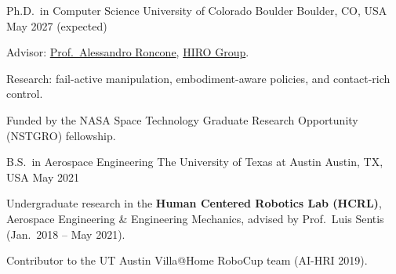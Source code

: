 
\begin{cventries}
  \cventry
  {Ph.D.\ in Computer Science}
  {University of Colorado Boulder}
  {Boulder, CO, USA}
  {May 2027 (expected)}
  {
    \begin{cvitems}
      \item Advisor: \href{https://hiro-group.ronc.one/}{Prof.\ Alessandro Roncone}, \href{https://hiro-group.ronc.one/}{HIRO Group}.
      \item Research: fail-active manipulation, embodiment-aware policies, and contact-rich control.
      \item Funded by the NASA Space Technology Graduate Research Opportunity (NSTGRO) fellowship.
    \end{cvitems}
  }

  \cventry
  {B.S.\ in Aerospace Engineering}
  {The University of Texas at Austin}
  {Austin, TX, USA}
  {May 2021}
  {
    \begin{cvitems}
      \item Undergraduate research in the \textbf{Human Centered Robotics Lab (HCRL)}, Aerospace Engineering \& Engineering Mechanics, advised by Prof.\ Luis Sentis (Jan.\ 2018 -- May 2021).
      \item Contributor to the UT Austin Villa@Home RoboCup team (AI-HRI 2019).
    \end{cvitems}
  }
\end{cventries}
